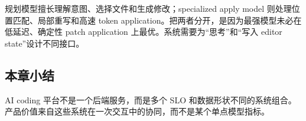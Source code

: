 规划模型擅长理解意图、选择文件和生成修改；specialized apply model 则处理位置匹配、局部重写和高速 token application。把两者分开，是因为最强模型未必在低延迟、确定性 patch application 上最优。系统需要为“思考”和“写入 editor state”设计不同接口。


\subsection{本章小结}

AI coding 平台不是一个后端服务，而是多个 SLO 和数据形状不同的系统组合。产品价值来自这些系统在一次交互中的协同，而不是某个单点模型指标。

